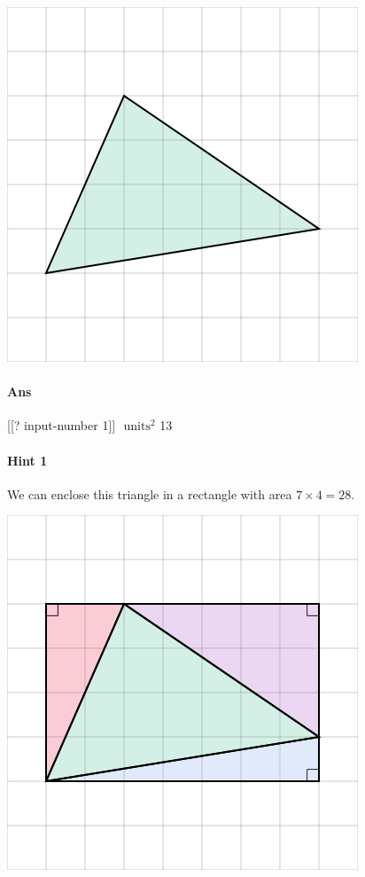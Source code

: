 \documentclass[twocolumn,10pt]{article}
\def\shrinkfactor{0.55}
\begin{document}
\includegraphics[scale=\shrinkfactor]{figures/027b98230cfeb2f7ef1f0c29da18b646763291f2.png}

\paragraph{Ans} [[? input-number 1]] $\text{ units}^2$  13

\paragraph{Hint 1}We can enclose this triangle in a rectangle with area $7 \times 4 =28$.   

\includegraphics[scale=\shrinkfactor]{figures/3c55e6c7b02fb352ff31b1b707c380e87a0b5b02.png}
\end{document}
